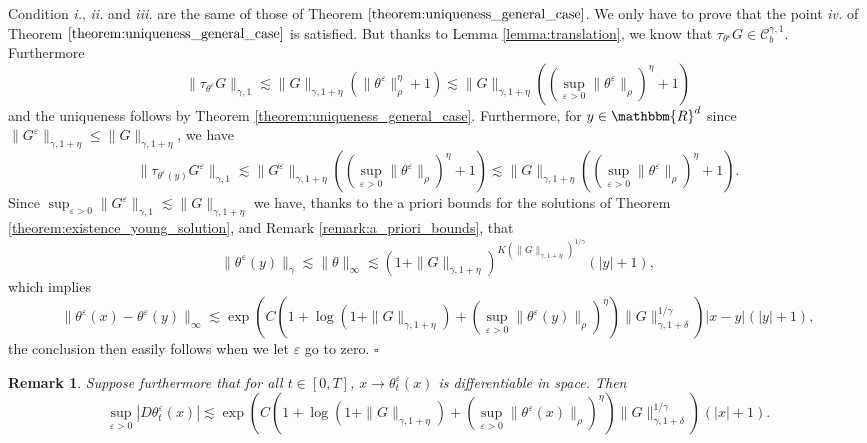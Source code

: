 \documentclass[a4paper,11pt]{article}
\newcommand{\tmtextit}[1]{{\itshape{#1}}}
\newtheorem{remark}[theorem]{Remark}
\newenvironment{proof}{{\sc Proof.}}{\hfill$\square$}
\newcommand{\CC}{\mathscr C}
\begin{document}
\begin{proof}
  Condition \tmtextit{i.}, \tmtextit{ii.} and \tmtextit{iii.} are the same of
  those of Theorem $\ref{theorem:uniqueness_general_case}$. We only have to
  prove that the point \tmtextit{iv.} of Theorem
  $\ref{theorem:uniqueness_general_case}$ is satisfied. But thanks to Lemma
  \ref{lemma:translation}, we know that $\tau_{\theta^{\varepsilon}} G \in
  \CC^{\gamma ,1}_{b}$. Furthermore
  \[ \| \tau_{\theta^{\varepsilon}} G \|_{\gamma ,1} \lesssim \| G \|_{\gamma
     ,1+ \eta} ( \| \theta^{\varepsilon} \|_{\rho}^{\eta} +1 ) \lesssim \| G
     \|_{\gamma ,1+ \eta} ( ( \sup_{\varepsilon >0} \| \theta^{\varepsilon}
     \|_{\rho} )^{\eta} +1 )  \]
  and the uniqueness follows by Theorem \ref{theorem:uniqueness_general_case}.
  Furthermore, for $y \in \mathbbm{R}^{d}$ since $\| G^{\varepsilon}
  \|_{\gamma ,1+ \eta} \leqslant \| G \|_{\gamma ,1+ \eta}$, we have
  \[ \| \tau_{\theta^{\varepsilon} ( y )} G^{\varepsilon} \|_{\gamma ,1}
     \lesssim \| G^{\varepsilon} \|_{\gamma ,1+ \eta} ( ( \sup_{\varepsilon
     >0} \| \theta^{\varepsilon} \|_{\rho} )^{\eta} +1 ) \lesssim \| G
     \|_{\gamma ,1+ \eta} ( ( \sup_{\varepsilon >0} \| \theta^{\varepsilon}
     \|_{\rho} )^{\eta} +1 ) . \]
  Since $\sup_{\varepsilon >0} \| G^{\varepsilon} \|_{\gamma ,1} \lesssim \| G
  \|_{\gamma ,1+ \eta}$ we have, thanks to the a priori bounds for the
  solutions of Theorem \ref{theorem:existence_young_solution}, and Remark
  \ref{remark:a_priori_bounds}, that
  \[ \| \theta^{\varepsilon} ( y ) \|_{\gamma} \lesssim \| \theta \|_{\infty}
     \lesssim ( 1+ \| G \|_{\gamma ,1+ \eta} )^{K ( \| G \|_{\gamma ,1+ \eta}
     )^{1/ \gamma}} ( | y | +1 ) , \]
  which implies \
  \[ \| \theta^{\varepsilon} ( x ) - \theta^{\varepsilon} ( y ) \|_{\infty}
     \lesssim \exp ( C ( 1+ \log ( 1+ \| G \|_{\gamma ,1+ \eta} ) + (
     \sup_{\varepsilon >0} \| \theta^{\varepsilon} ( y ) \|_{\rho} )^{\eta} )
     \| G \|_{\gamma ,1+ \delta}^{1/ \gamma} ) | x-y |^{} ( | y | +1 ) , \]
  the conclusion then easily follows when we let $\varepsilon$ go to zero.
\end{proof}

\begin{remark}
  \label{remark:bound_approximated_flow}Suppose furthermore that for all $t
  \in [ 0,T ]$, $x \rightarrow \theta^{\varepsilon}_{t} ( x )$ is
  differentiable in space. Then
  \[ \sup_{\varepsilon >0}   | D \theta^{\varepsilon}_{t} ( x ) | \lesssim
     \exp ( C ( 1+ \log ( 1+ \| G \|_{\gamma ,1+ \eta} ) + ( \sup_{\varepsilon
     >0} \| \theta^{\varepsilon} ( x ) \|_{\rho} )^{\eta} ) \| G \|_{\gamma
     ,1+ \delta}^{1/ \gamma} )^{} ( | x | +1 ). \]
\end{remark}
\end{document}
